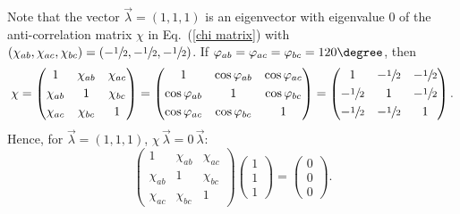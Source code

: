 Note that the vector $\vec{\lambda} = (1, 1, 1)$ is an eigenvector with eigenvalue 0 of the anti-correlation matrix $\chi$ in Eq.\ (\ref{chi matrix}) with $(\chi_{ab}, \chi_{ac}, \chi_{bc}) = (-\sfrac12, -\sfrac12, -\sfrac12)$. If $\varphi_{ab} = \varphi_{ac} = \varphi_{bc} = 120\degree$, then
\begin{equation}
\chi = \begin{pmatrix}
1 & \chi_{ab} & \chi_{ac}  \\[.1cm]
\chi_{ab} & 1 & \chi_{bc} \\[.1cm]
\chi_{ac} & \chi_{bc} & 1
\end{pmatrix}
=
\begin{pmatrix}
1 & \cos{\varphi_{ab}} & \cos{\varphi_{ac}} \\[.1cm]
\cos{\varphi_{ab}} & 1 & \cos{\varphi_{bc}} \\[.1cm]
\cos{\varphi_{ac}} & \cos{\varphi_{bc}} & 1
\end{pmatrix}
=
\begin{pmatrix}
1 & -\sfrac12 & -\sfrac12 \\[.1cm]
-\sfrac12 & 1 & -\sfrac12 \\[.1cm]
 -\sfrac12 & -\sfrac12 & 1
\end{pmatrix}.
\label{chi 120 deg}
\end{equation}
Hence, for $\vec{\lambda} = (1, 1, 1)$, $\chi \, \vec{\lambda} = 0 \, \vec{\lambda}$:
\begin{equation}
\begin{pmatrix}
1 & \chi_{ab} & \chi_{ac}  \\[.1cm]
\chi_{ab} & 1 & \chi_{bc} \\[.1cm]
\chi_{ac} & \chi_{bc} & 1
\end{pmatrix} \!
\begin{pmatrix}
1 \\[.1cm]
1 \\[.1cm]
1
\end{pmatrix}
=
\begin{pmatrix}
0 \\[.1cm]
0 \\[.1cm]
0
\end{pmatrix}.
\label{eigenvector (111)}
\end{equation}

